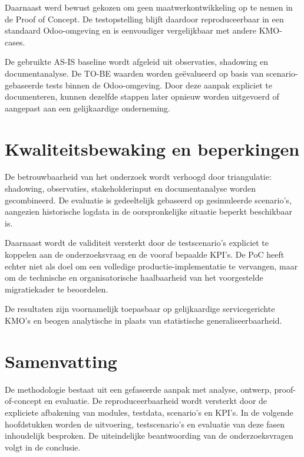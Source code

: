 Daarnaast werd bewust gekozen om geen maatwerkontwikkeling op te nemen in de Proof of Concept. De testopstelling blijft daardoor reproduceerbaar in een standaard Odoo-omgeving en is eenvoudiger vergelijkbaar met andere KMO-cases.

De gebruikte AS-IS baseline wordt afgeleid uit observaties, shadowing en documentanalyse. De TO-BE waarden worden geëvalueerd op basis van scenario-gebaseerde tests binnen de Odoo-omgeving. Door deze aanpak expliciet te documenteren, kunnen dezelfde stappen later opnieuw worden uitgevoerd of aangepast aan een gelijkaardige onderneming.

\section{Kwaliteitsbewaking en beperkingen}

De betrouwbaarheid van het onderzoek wordt verhoogd door triangulatie: shadowing, observaties, stakeholderinput en documentanalyse worden gecombineerd. De evaluatie is gedeeltelijk gebaseerd op gesimuleerde scenario’s, aangezien historische logdata in de oorspronkelijke situatie beperkt beschikbaar is.

Daarnaast wordt de validiteit versterkt door de testscenario’s expliciet te koppelen aan de onderzoeksvraag en de vooraf bepaalde KPI’s. De PoC heeft echter niet als doel om een volledige productie-implementatie te vervangen, maar om de technische en organisatorische haalbaarheid van het voorgestelde migratiekader te beoordelen.

De resultaten zijn voornamelijk toepasbaar op gelijkaardige servicegerichte KMO’s en beogen analytische in plaats van statistische generaliseerbaarheid.

\section{Samenvatting}

De methodologie bestaat uit een gefaseerde aanpak met analyse, ontwerp, proof-of-concept en evaluatie. De reproduceerbaarheid wordt versterkt door de expliciete afbakening van modules, testdata, scenario’s en KPI’s. In de volgende hoofdstukken worden de uitvoering, testscenario’s en evaluatie van deze fasen inhoudelijk besproken. De uiteindelijke beantwoording van de onderzoeksvragen volgt in de conclusie.